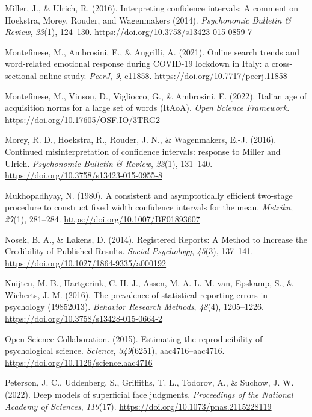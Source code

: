 \documentclass[
  man]{apa7}
\newlength{\cslhangindent}
\newenvironment{CSLReferences}[2] %
 {\begin{list}{}{%
  \setlength{\itemindent}{0pt}
  \setlength{\leftmargin}{0pt}
  \setlength{\parsep}{0pt}
  \ifodd #1
   \setlength{\leftmargin}{\cslhangindent}
   \setlength{\itemindent}{-1\cslhangindent}
  \fi
  \setlength{\itemsep}{#2\baselineskip}}}
 {\end{list}}
\begin{document}
\begin{CSLReferences}{1}{0}
Miller, J., \& Ulrich, R. (2016). Interpreting confidence intervals: A comment on Hoekstra, Morey, Rouder, and Wagenmakers (2014). \emph{Psychonomic Bulletin \& Review}, \emph{23}(1), 124--130. \url{https://doi.org/10.3758/s13423-015-0859-7}

Montefinese, M., Ambrosini, E., \& Angrilli, A. (2021). Online search trends and word-related emotional response during COVID-19 lockdown in Italy: a cross-sectional online study. \emph{PeerJ}, \emph{9}, e11858. \url{https://doi.org/10.7717/peerj.11858}

Montefinese, M., Vinson, D., Vigliocco, G., \& Ambrosini, E. (2022). Italian age of acquisition norms for a large set of words (ItAoA). \emph{Open Science Framework}. \url{https://doi.org/10.17605/OSF.IO/3TRG2}

Morey, R. D., Hoekstra, R., Rouder, J. N., \& Wagenmakers, E.-J. (2016). Continued misinterpretation of confidence intervals: response to Miller and Ulrich. \emph{Psychonomic Bulletin \& Review}, \emph{23}(1), 131--140. \url{https://doi.org/10.3758/s13423-015-0955-8}

Mukhopadhyay, N. (1980). A consistent and asymptotically efficient two-stage procedure to construct fixed width confidence intervals for the mean. \emph{Metrika}, \emph{27}(1), 281--284. \url{https://doi.org/10.1007/BF01893607}

Nosek, B. A., \& Lakens, D. (2014). Registered Reports: A Method to Increase the Credibility of Published Results. \emph{Social Psychology}, \emph{45}(3), 137--141. \url{https://doi.org/10.1027/1864-9335/a000192}

Nuijten, M. B., Hartgerink, C. H. J., Assen, M. A. L. M. van, Epskamp, S., \& Wicherts, J. M. (2016). The prevalence of statistical reporting errors in psychology (1985{\textendash}2013). \emph{Behavior Research Methods}, \emph{48}(4), 1205--1226. \url{https://doi.org/10.3758/s13428-015-0664-2}

Open Science Collaboration. (2015). Estimating the reproducibility of psychological science. \emph{Science}, \emph{349}(6251), aac4716--aac4716. \url{https://doi.org/10.1126/science.aac4716}

Peterson, J. C., Uddenberg, S., Griffiths, T. L., Todorov, A., \& Suchow, J. W. (2022). Deep models of superficial face judgments. \emph{Proceedings of the National Academy of Sciences}, \emph{119}(17). \url{https://doi.org/10.1073/pnas.2115228119}


\end{CSLReferences}
\end{document}
